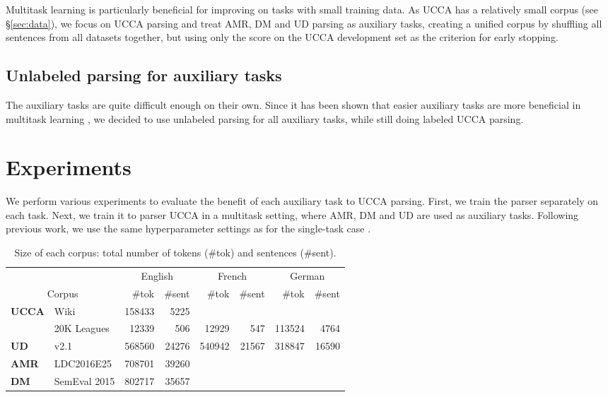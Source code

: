 \documentclass[11pt,a4paper]{article}
\begin{document}
Multitask learning is particularly beneficial for improving on tasks with small training data.
As UCCA has a relatively small corpus (see \S\ref{sec:data}),
we focus on UCCA parsing and treat AMR, DM and UD parsing
as auxiliary tasks, creating a unified corpus by shuffling all sentences from all datasets together,
but using only the score on the UCCA development set as the criterion for early stopping.

\subsection{Unlabeled parsing for auxiliary tasks}\label{sec:unlabeled_aux}

The auxiliary tasks are quite difficult enough on their own.
Since it has been shown that easier auxiliary tasks are more beneficial
in multitask learning \cite{E17-2026},
we decided to use unlabeled parsing for all auxiliary tasks, while still doing
labeled UCCA parsing.


\section{Experiments}\label{sec:experiments}

We perform various experiments to evaluate the benefit of each auxiliary task to UCCA parsing.
First, we train the parser separately on each task.
Next, we train it to parser UCCA in a multitask setting, where AMR, DM and UD are used as
auxiliary tasks. Following previous work, we use the same hyperparameter settings
as for the single-task case \cite{N16-1179,P16-2038,C16-1013,C16-1059,C16-1179,E17-1005}.

\begin{table*}[ht]
\begin{tabular}{ll|rr|rr|rr}
\hline
& & \multicolumn{2}{c|}{English} & \multicolumn{2}{c|}{French} & \multicolumn{2}{c}{German} \\
\multicolumn{2}{c|}{Corpus} & {\#}tok & {\#}sent & {\#}tok & {\#}sent & {\#}tok & {\#}sent \\
\hline
\textbf{UCCA}
& Wiki & 158433 & 5225 &&&& \\
& 20K Leagues & 12339 & 506 & 12929 & 547 & 113524 & 4764 \\
\hline
\textbf{UD} & v2.1 & 568560 & 24276 & 540942 & 21567 & 318847 & 16590 \\
\hline
\textbf{AMR} & LDC2016E25 & 708701 & 39260 \\
\hline
\textbf{DM} & SemEval 2015 & 802717 & 35657 \\
\end{tabular}
\caption{Size of each corpus: total number of tokens ({\#}tok) and sentences
({\#}sent).\label{tab:corpora}}
\end{table*}
\end{document}
